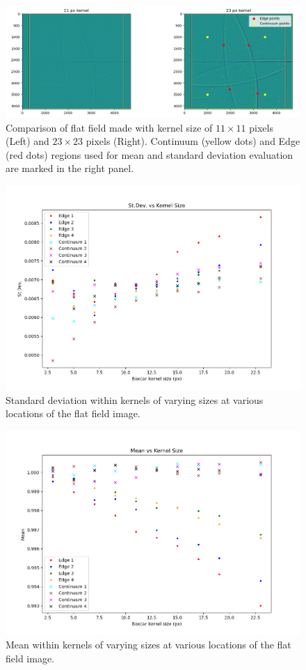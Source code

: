 \documentclass[11pt,a4paper]{article}
\begin{document}
	\begin{figure}
		\centering
		\includegraphics[width=0.8\linewidth]{pics/kernel_compare.png}
		\caption{Comparison of flat field made with kernel size of $11 \times 11$ pixels (Left) and $23 \times 23 $ pixels (Right). Continuum (yellow dots) and Edge (red dots) regions used for mean and standard deviation evaluation are marked in the right panel.}
		\label{fig:kernelcompare}
	\end{figure}

	\begin{figure}
		\centering
		\includegraphics[width=0.9\linewidth]{pics/stdev.png}
		\caption{Standard deviation within kernels of varying sizes at various locations of the flat field image.}
		\label{fig:st}
	\end{figure}

	\begin{figure}
	\centering
	\includegraphics[width=0.9\linewidth]{pics/mean}
	\caption{Mean within kernels of varying sizes at various locations of the flat field image.}
	\label{fig:mean}
	\end{figure}
\end{document}
